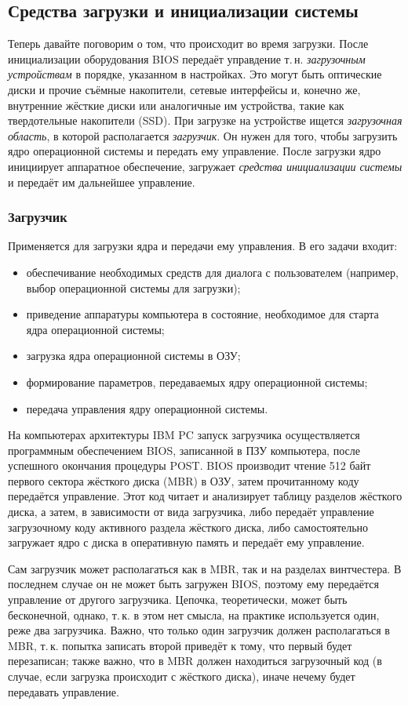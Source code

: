 \subsection{Средства загрузки и инициализации системы}
 Теперь давайте поговорим о том, что происходит во время загрузки. После инициализации оборудования BIOS передаёт управдение т.\,н. \emph{загрузочным устройствам} в порядке, указанном в настройках. Это могут быть оптические диски и прочие съёмные накопители, сетевые интерфейсы и, конечно же, внутренние жёсткие диски или аналогичные им устройства, такие как твердотельные накопители (SSD).
 При загрузке на устройстве ищется \emph{загрузочная область}, в которой располагается \emph{загрузчик}. Он нужен для того, чтобы загрузить ядро операционной системы и передать ему управление. После загрузки ядро инициирует аппаратное обеспечение, загружает \emph{средства инициализации системы} и передаёт им дальнейшее управление.
 
 \subsubsection{Загрузчик}
 Применяется для загрузки ядра и передачи ему управления. В его задачи входит:
 \begin{itemize}
  \item обеспечивание необходимых средств для диалога с пользователем (например, выбор операционной системы для загрузки);
  \item приведение аппаратуры компьютера в состояние, необходимое для старта ядра операционной системы;
  \item загрузка ядра операционной системы в ОЗУ;
  \item формирование параметров, передаваемых ядру операционной системы;
  \item передача управления ядру операционной системы.
 \end{itemize}
  На компьютерах архитектуры IBM PC запуск загрузчика осуществляется программным обеспечением BIOS, записанной в ПЗУ компьютера, после успешного окончания процедуры POST. BIOS производит чтение 512 байт первого сектора жёсткого диска (MBR) в ОЗУ, затем прочитанному коду передаётся управление. Этот код читает и анализирует таблицу разделов жёсткого диска, а затем, в зависимости от вида загрузчика, либо передаёт управление загрузочному коду активного раздела жёсткого диска, либо самостоятельно загружает ядро с диска в оперативную память и передаёт ему управление.
  
  Сам загрузчик может располагаться как в MBR, так и на разделах винтчестера. В последнем случае он не может быть загружен BIOS, поэтому ему передаётся управление от другого загрузчика. Цепочка, теоретически, может быть бесконечной, однако, т.\,к. в этом нет смысла, на практике используется один, реже два загрузчика. Важно, что только один загрузчик должен располагаться в MBR, т.\,к. попытка записать второй приведёт к тому, что первый будет перезаписан;
  также важно, что в MBR должен находиться загрузочный код (в случае, если загрузка происходит с жёсткого диска), иначе нечему будет передавать управление.
  
